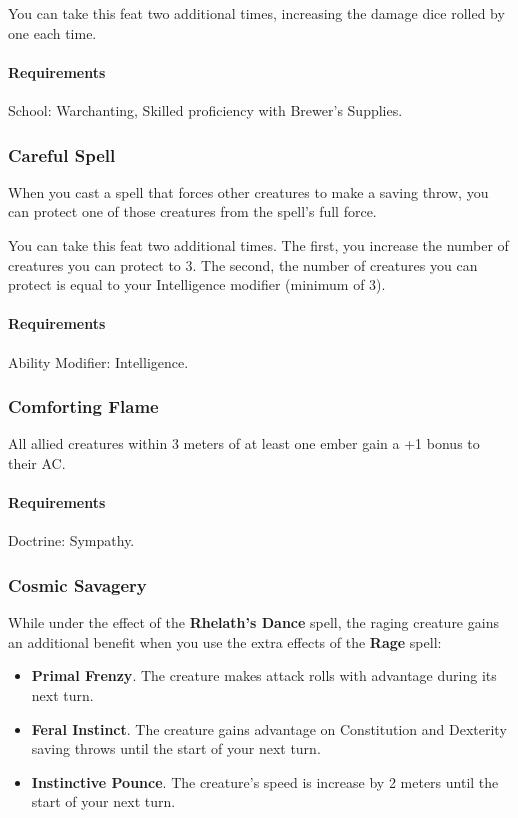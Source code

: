     You can take this feat two additional times, increasing the damage dice rolled by one each time.
    \paragraph{Requirements} School: Warchanting, Skilled proficiency with Brewer's Supplies.
\subsubsection{Careful Spell} \label{feat::carefulspell}
    When you cast a spell that forces other creatures to make a saving throw, you can protect one of those creatures from the spell's full force.

    You can take this feat two additional times.
    The first, you increase the number of creatures you can protect to 3.
    The second, the number of creatures you can protect is equal to your Intelligence modifier (minimum of 3).
    \paragraph{Requirements} Ability Modifier: Intelligence.
\subsubsection{Comforting Flame} \label{feat::comfortingflame}
    All allied creatures within 3 meters of at least one ember gain a +1 bonus to their AC.
    \paragraph{Requirements} Doctrine: Sympathy.
\subsubsection{Cosmic Savagery} \label{feat::cosmicsavaregy}
    While under the effect of the \textbf{Rhelath's Dance} spell, the raging creature gains an additional benefit when you use the extra effects of the \textbf{Rage} spell:
    \begin{itemize}
        \item \textbf{Primal Frenzy}.
            The creature makes attack rolls with advantage during its next turn.
        \item \textbf{Feral Instinct}.
            The creature gains advantage on Constitution and Dexterity saving throws until the start of your next turn.
        \item \textbf{Instinctive Pounce}.
            The creature's speed is increase by 2 meters until the start of your next turn.
    \end{itemize}
